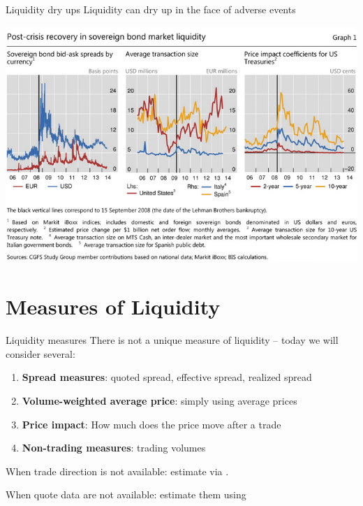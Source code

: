 \documentclass[english,10pt
,aspectratio=169
]{beamer}
\begin{document}
\begin{frame}{Liquidity dry ups}
	Liquidity can dry up in the face of adverse events
	\begin{center}
		\includegraphics[scale=0.5]{pics/L2_liquiditylehman}
	\end{center}
\end{frame}



\section{Measures of Liquidity}


\begin{frame}{Liquidity measures}
There is not a unique measure of liquidity -- today we will consider several:
\begin{enumerate}
	\item \textbf{Spread measures}: quoted spread, effective spread, realized spread
	\item \textbf{Volume-weighted average price}: simply using average prices
	\item \textbf{Price impact}: How much does the price move after a trade
	\item \textbf{Non-trading measures}: trading volumes
\end{enumerate}

When trade direction is not available: estimate via . 

When quote data are not available: estimate them using 
\end{frame}
\end{document}
